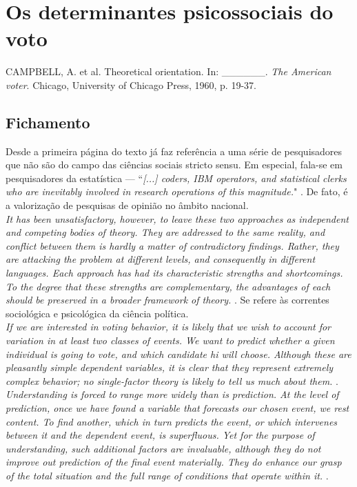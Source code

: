 \section{Os determinantes psicossociais do voto}

CAMPBELL, A. et al. Theoretical orientation. In: \_\_\_\_\_\_. \textit{The American voter}. Chicago, University of Chicago Press, 1960, p. 19-37.

\subsection{Fichamento}

Desde a primeira página do texto já faz referência a uma série de pesquisadores que não são do campo das ciências sociais stricto sensu. Em especial, fala-se em pesquisadores da estatística --- ``\textit{[...] coders, IBM operators, and statistical clerks who are inevitably involved in research operations of this magnitude.}" \cite{campbell}. De fato, é a valorização de pesquisas de opinião no âmbito nacional. \\

\noindent \textit{It has been unsatisfactory, however, to leave these two approaches as independent and competing bodies of theory. They are addressed to the same reality, and conflict between them is hardly a matter of contradictory findings. Rather, they are attacking the problem at different levels, and consequently in different languages. Each approach has had its characteristic strengths and shortcomings. To the degree that these strengths are complementary, the advantages of each should be preserved in a broader framework of theory.} \cite[~p. 18]{campbell}. Se refere às correntes sociológica e psicológica da ciência política. \\

\noindent \textit{If we are interested in voting behavior, it is likely that we wish to account for variation in at least two classes of events. We want to predict whether a given individual is going to vote, and which candidate hi will choose. Although these are pleasantly simple dependent variables, it is clear that they represent extremely complex behavior; no single-factor theory is likely to tell us much about them.} \cite[~p. 19]{campbell}. \\

\noindent \textit{Understanding is forced to range more widely than is prediction. At the level of prediction, once we have found a variable that forecasts our chosen event, we rest content. To find another, which in turn predicts the event, or which intervenes between it and the dependent event, is superfluous. Yet for the purpose of understanding, such additional factors are invaluable, although they do not improve out prediction of the final event materially. They do enhance our grasp of the total situation and the full range of conditions that operate within it.} \cite[~p. 20]{campbell}. 

